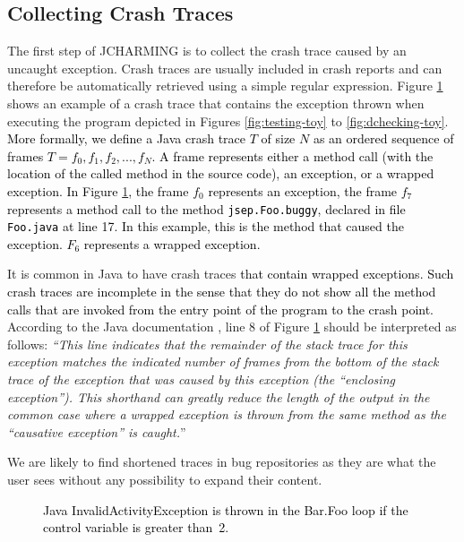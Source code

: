 \documentclass[times, doublespace]{smrauth}
\newcommand{\red}[1]{\textcolor{black}{#1}}
\begin{document}
\subsection{Collecting Crash Traces}

The first step of JCHARMING is to collect the crash trace
caused by an uncaught exception. Crash traces are usually included in crash reports and can therefore be automatically
retrieved using a simple regular expression.
Figure \ref{fig:jcarming-traces} shows an example of a crash trace that contains the
exception thrown when executing the program depicted in
Figures \ref{fig:testing-toy} to \ref{fig:dchecking-toy}.
\red{More formally, we define a Java crash trace $T$ of size $N$ as an ordered sequence of frames $T={f_0, f_1, f_2, ..., f_N}$. A frame represents either a method call (with the location of the called method in the source code), an exception, or a wrapped exception.
In Figure \ref{fig:jcarming-traces}, the frame $f_0$ represents an exception, the frame  $f_7$ represents a method call to the method \texttt{jsep.Foo.buggy}, declared in file \texttt{Foo.java} at  line 17. In this example, this is the method that caused the exception. $F_6$ represents a wrapped exception.}

It is common in Java to have crash
traces \red{that contain wrapped exceptions.
Such crash traces are incomplete in the sense that they do not show all the method calls that are invoked from the entry point of the program to the crash point.}
According to the Java documentation \cite{Oracle2011}, line 8 of
Figure \ref{fig:jcarming-traces} should be interpreted as follows: {\it ``This line indicates
that the remainder of the stack trace for this exception
matches the indicated number of frames from the bottom of the
stack trace of the exception that was caused by this exception
(the ``enclosing exception''). This shorthand can greatly
reduce the length of the output in the common case where a
wrapped exception is thrown from the same method as the
``causative exception'' is caught.}''

We are likely to find shortened traces in bug repositories as
they are what the user sees without any possibility to expand
their content.


\begin{figure}
  \noindent{}
    \caption{\red{Java InvalidActivityException is thrown in the Bar.Foo loop if the control variable is greater than~2.}
    \label{fig:jcarming-traces}}
\end{figure}
\end{document}
